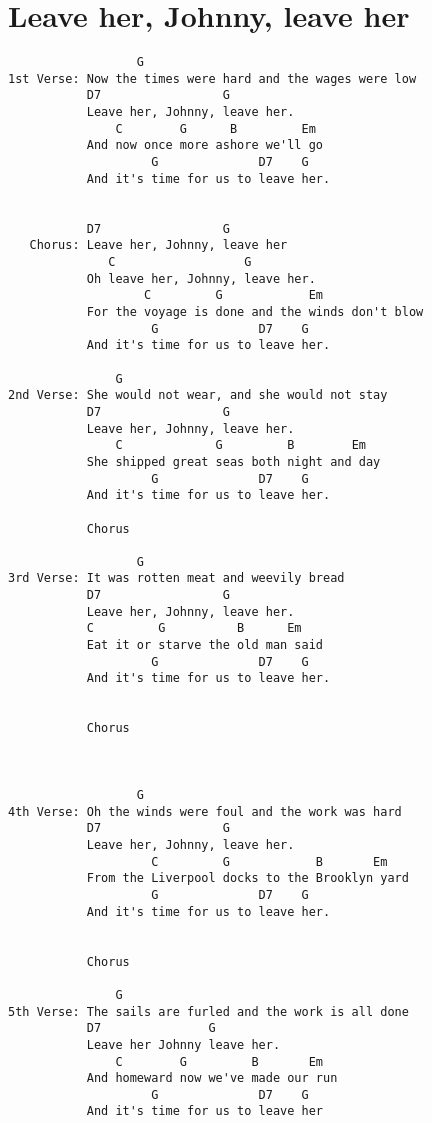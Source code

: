 \documentclass[leqno]{memoir}
\begin{document}
\chapter{Leave her, Johnny, leave her}
\begin{verbatim}
                  G
1st Verse: Now the times were hard and the wages were low
           D7                 G
           Leave her, Johnny, leave her.
               C        G      B         Em
           And now once more ashore we'll go
                    G              D7    G
           And it's time for us to leave her.


           D7                 G
   Chorus: Leave her, Johnny, leave her
              C                  G
           Oh leave her, Johnny, leave her.
                   C         G            Em
           For the voyage is done and the winds don't blow
                    G              D7    G
           And it's time for us to leave her.
           
               G
2nd Verse: She would not wear, and she would not stay
           D7                 G
           Leave her, Johnny, leave her.
               C             G         B        Em
           She shipped great seas both night and day
                    G              D7    G
           And it's time for us to leave her.

           Chorus

                  G
3rd Verse: It was rotten meat and weevily bread
           D7                 G
           Leave her, Johnny, leave her.
           C         G          B      Em
           Eat it or starve the old man said
                    G              D7    G
           And it's time for us to leave her.


           Chorus



                  G
4th Verse: Oh the winds were foul and the work was hard
           D7                 G
           Leave her, Johnny, leave her.
                    C         G            B       Em
           From the Liverpool docks to the Brooklyn yard
                    G              D7    G
           And it's time for us to leave her.


           Chorus

               G
5th Verse: The sails are furled and the work is all done
           D7               G
           Leave her Johnny leave her.
               C        G         B       Em
           And homeward now we've made our run
                    G              D7    G
           And it's time for us to leave her



\end{verbatim}
\end{document}
